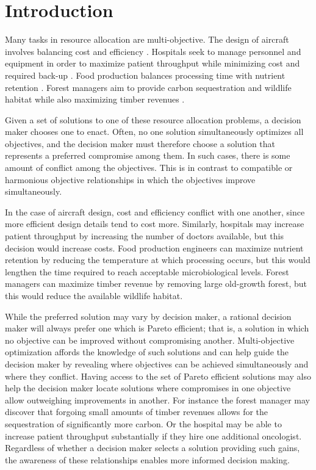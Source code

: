 \chapter{Introduction}
\label{ch:intro}

Many tasks in resource allocation are multi-objective. The design of aircraft involves balancing cost and efficiency \cite{wang2014multi}. Hospitals seek to manage personnel and equipment in order to maximize patient throughput while minimizing cost and required back-up \cite{hutzschenreuter2009evolutionary}. Food production balances processing time with nutrient retention \cite{sendin2010efficient}. Forest managers aim to provide carbon sequestration and wildlife habitat while also maximizing timber revenues \cite{toth2013ecosel}.

Given a set of solutions to one of these resource allocation problems, a decision maker chooses one to enact. Often, no one solution simultaneously optimizes all objectives, and the decision maker must therefore choose a solution that represents a preferred compromise among them. In such cases, there is some amount of conflict among the objectives. This is in contrast to compatible or harmonious objective relationships in which the objectives improve simultaneously.

In the case of aircraft design, cost and efficiency conflict with one another, since more efficient design details tend to cost more. Similarly, hospitals may increase patient throughput by increasing the number of doctors available, but this decision would increase costs. Food production engineers can maximize nutrient retention by reducing the temperature at which processing occurs, but this would lengthen the time required to reach acceptable microbiological levels. Forest managers can maximize timber revenue by removing large old-growth forest, but this would reduce the available wildlife habitat.

While the preferred solution may vary by decision maker, a rational decision maker will always prefer one which is Pareto efficient; that is, a solution in which no objective can be improved without compromising another. Multi-objective optimization affords the knowledge of such solutions and can help guide the decision maker by revealing where objectives can be achieved simultaneously and where they conflict. Having access to the set of Pareto efficient solutions may also help the decision maker locate solutions where compromises in one objective allow outweighing improvements in another. For instance the forest manager may discover that forgoing small amounts of timber revenues allows for the sequestration of significantly more carbon. Or the hospital may be able to increase patient throughput substantially if they hire one additional oncologist.
Regardless of whether a decision maker selects a solution providing such gains, the awareness of these relationships enables more informed decision making.

